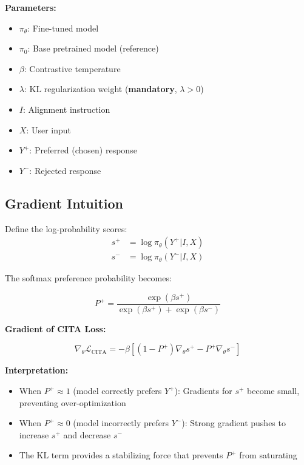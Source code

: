 \textbf{Parameters:}
\begin{itemize}[leftmargin=*,itemsep=1pt]
    \item $\pi_\theta$: Fine-tuned model
    \item $\pi_0$: Base pretrained model (reference)
    \item $\beta$: Contrastive temperature
    \item $\lambda$: KL regularization weight (\textbf{mandatory}, $\lambda > 0$)
    \item $I$: Alignment instruction
    \item $X$: User input
    \item $Y^+$: Preferred (chosen) response
    \item $Y^-$: Rejected response
\end{itemize}

\subsection{Gradient Intuition}

Define the log-probability scores:
\begin{align}
s^+ &= \log \pi_\theta(Y^+ | I, X) \\
s^- &= \log \pi_\theta(Y^- | I, X)
\end{align}

The softmax preference probability becomes:

\begin{equation}
P^+ = \frac{\exp(\beta s^+)}{\exp(\beta s^+) + \exp(\beta s^-)}
\label{eq:softmax_pref}
\end{equation}

\textbf{Gradient of CITA Loss:}

\begin{equation}
\nabla_\theta \mathcal{L}_{\text{CITA}} = -\beta \left[(1 - P^+)\nabla_\theta s^+ - P^+ \nabla_\theta s^-\right]
\label{eq:cita_gradient}
\end{equation}

\textbf{Interpretation:}
\begin{itemize}[leftmargin=*,itemsep=1pt]
    \item When $P^+ \approx 1$ (model correctly prefers $Y^+$): Gradients for $s^+$ become small, preventing over-optimization
    \item When $P^+ \approx 0$ (model incorrectly prefers $Y^-$): Strong gradient pushes to increase $s^+$ and decrease $s^-$
    \item The KL term provides a stabilizing force that prevents $P^+$ from saturating
\end{itemize}

